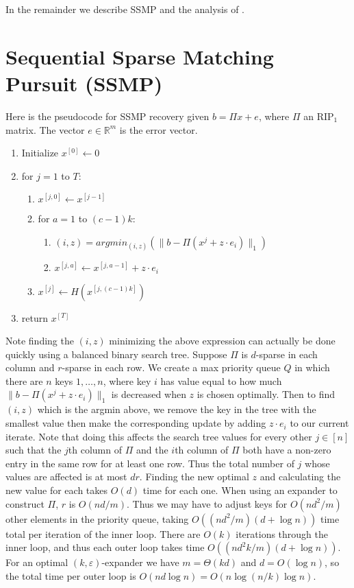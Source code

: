 \documentclass[11pt]{article}
\newcommand{\eps}{\varepsilon}
\begin{document}
In the remainder we describe SSMP and the analysis of \cite{Price10}.

\section{Sequential Sparse Matching Pursuit (SSMP)}
Here is the pseudocode for SSMP recovery given $b = \Pi x + e$, where $\Pi$ an RIP$_1$ matrix. The vector $e\in\mathbb{R}^m$ is the error vector.

\begin{enumerate}
\item Initialize $x^{[0]} \leftarrow 0$
\item for $j = 1$ to $T$:
    \begin{enumerate}
        \item $x^{[j, 0]} \leftarrow x^{[j - 1]}$
        \item for $a = 1$ to $(c - 1)k$:
        \begin{enumerate}
            \item $(i, z) = argmin_{(i, z)}(\|b - \Pi(x^{j} + z \cdot e_i)\|_1)$
            \item $x^{[j, a]} \leftarrow x^{[j, a - 1]} + z \cdot e_i$
        \end{enumerate}
        \item $x^{[j]} \leftarrow H(x^{[j, (c - 1)k]})$
    \end{enumerate}
\item return $x^{[T]}$
\end{enumerate}

Note finding the $(i,z)$ minimizing the above expression can actually be done quickly using a balanced binary search tree. Suppose $\Pi$ is $d$-sparse in each column and $r$-sparse in each row. We create a max priority queue $Q$ in which there are $n$ keys $1,\ldots,n$, where key $i$ has value equal to how much  $\|b - \Pi(x^{j} + z \cdot e_i)\|_1$ is decreased when $z$ is chosen optimally. Then to find $(i,z)$ which is the argmin above, we remove the key in the tree with the smallest value  then make the corresponding update by adding $z\cdot e_i$ to our current iterate. Note that doing this affects the search tree values for every other $j\in[n]$ such that the $j$th column of $\Pi$ and the $i$th column of $\Pi$ both have a non-zero entry in the same row for at least one row. Thus the total number of $j$ whose values are affected is at most $dr$. Finding the new optimal $z$ and calculating the new value for each takes $O(d)$ time for each one. When using an expander to construct $\Pi$, $r$ is $O(nd/m)$. Thus we may have to adjust keys for $O(nd^2/m)$ other elements in the priority queue, taking $O((nd^2/m)(d + \log n))$ time total per iteration of the inner loop. There are $O(k)$ iterations through the inner loop, and thus each outer loop takes time $O((nd^2k/m)(d + \log n))$. For an optimal $(k,\eps)$-expander we have $m = \Theta(kd)$ and $d = O(\log n)$, so the total time per outer loop is $O(nd\log n) = O(n\log(n/k)\log n)$.
\end{document}
